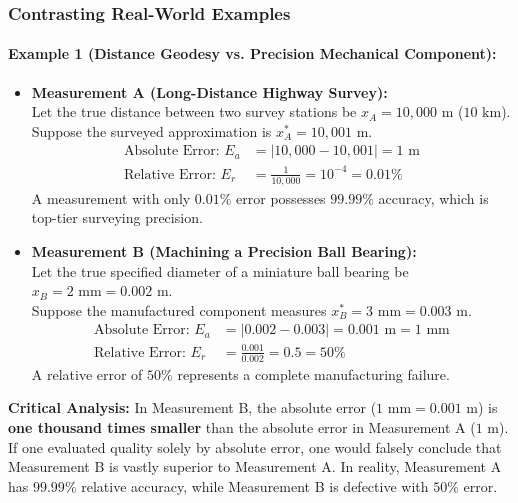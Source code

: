 \documentclass[11pt,a4paper]{article}
\newcommand{\abs}[1]{\left\lvert#1\right\rvert}
\begin{document}
\subsubsection*{Contrasting Real-World Examples}

\paragraph{Example 1 (Distance Geodesy vs. Precision Mechanical Component):}
\begin{itemize}[leftmargin=*]
    \item \textbf{Measurement A (Long-Distance Highway Survey):}\\
    Let the true distance between two survey stations be $x_A = 10{,}000\text{ m}$ ($10\text{ km}$).\\
    Suppose the surveyed approximation is $x_{A}^* = 10{,}001\text{ m}$.
    \begin{align}
        \text{Absolute Error: } E_a &= \abs{10{,}000 - 10{,}001} = 1\text{ m} \\
        \text{Relative Error: } E_r &= \frac{1}{10{,}000} = 10^{-4} = 0.01\%
    \end{align}
    A measurement with only $0.01\%$ error possesses $99.99\%$ accuracy, which is top-tier surveying precision.

    \item \textbf{Measurement B (Machining a Precision Ball Bearing):}\\
    Let the true specified diameter of a miniature ball bearing be $x_B = 2\text{ mm} = 0.002\text{ m}$.\\
    Suppose the manufactured component measures $x_B^* = 3\text{ mm} = 0.003\text{ m}$.
    \begin{align}
        \text{Absolute Error: } E_a &= \abs{0.002 - 0.003} = 0.001\text{ m} = 1\text{ mm} \\
        \text{Relative Error: } E_r &= \frac{0.001}{0.002} = 0.5 = 50\%
    \end{align}
    A relative error of $50\%$ represents a complete manufacturing failure.
\end{itemize}

\noindent\textbf{Critical Analysis:}
In Measurement B, the absolute error ($1\text{ mm} = 0.001\text{ m}$) is \textbf{one thousand times smaller} than the absolute error in Measurement A ($1\text{ m}$). If one evaluated quality solely by absolute error, one would falsely conclude that Measurement B is vastly superior to Measurement A. In reality, Measurement A has $99.99\%$ relative accuracy, while Measurement B is defective with $50\%$ error.
\end{document}
